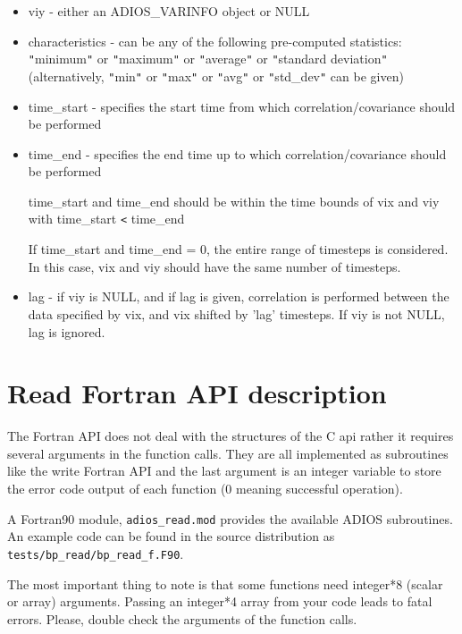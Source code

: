 \begin{itemize}
\item viy - either an ADIOS\_VARINFO object or NULL 

\item characteristics - can be any of the following pre-computed 
statistics: \texttt{"}minimum\texttt{"} or \texttt{"}maximum\texttt{"} or \texttt{"}average\texttt{"} 
or \texttt{"}standard deviation\texttt{"} (alternatively, \texttt{"}min\texttt{"} 
or \texttt{"}max\texttt{"} or \texttt{"}avg\texttt{"} or \texttt{"}std\_dev\texttt{"} 
can be given)

\item time\_start - specifies the start time from which correlation/covariance 
should be performed

\item time\_end - specifies the end time up to which correlation/covariance 
should be performed

time\_start and time\_end should be within the time bounds of vix and viy with 
time\_start \texttt{<} time\_end

If time\_start and time\_end = 0, the entire range of timesteps is considered. 
In this case, vix and viy should have the same number of timesteps.

\item lag - if viy is NULL, and if lag is given, correlation is performed 
between the data specified by vix, and vix shifted by 'lag' timesteps.  If viy 
is not NULL, lag is ignored.
\end{itemize}


\section{Read Fortran API description}
\label{section:read_fortran_api}

The Fortran API does not deal with the structures of the C api rather it requires 
several arguments in the function calls.  They are all implemented as subroutines 
like the write Fortran API and the last argument is an integer variable to store 
the error code output of each function (0 meaning successful operation). 

A Fortran90 module, \verb+adios_read.mod+ provides the available ADIOS subroutines. 
An example code can be found in the source distribution as 
\verb+tests/bp_read/bp_read_f.F90+.

The most important thing to note is that some functions need integer*8 (scalar 
or array) arguments. Passing an integer*4 array from your code leads to fatal errors. 
Please, double check the arguments of the function calls. 

